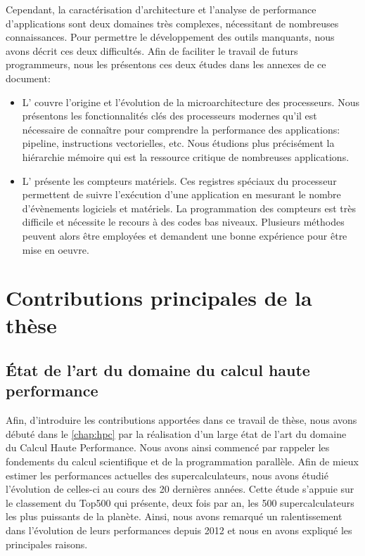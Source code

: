         Cependant, la caractérisation d'architecture et l'analyse de performance d'applications sont deux domaines très complexes, nécessitant de nombreuses connaissances. Pour permettre le développement des outils manquants, nous avons décrit ces deux difficultés. Afin de faciliter le travail de futurs programmeurs, nous les présentons ces deux études dans les annexes de ce document:
        \begin{itemize}
            \item L' couvre l'origine et l'évolution de la microarchitecture des processeurs. Nous présentons les fonctionnalités clés des processeurs modernes qu'il est nécessaire de connaître pour comprendre la performance des applications: pipeline, instructions vectorielles, etc. Nous étudions plus précisément la hiérarchie mémoire qui est la ressource critique de nombreuses applications. 
            
            \item L' présente les compteurs matériels. Ces registres spéciaux du processeur permettent de suivre l'exécution d'une application en mesurant le nombre d'évènements logiciels et matériels. La programmation des compteurs est très difficile et nécessite le recours à des codes bas niveaux. Plusieurs méthodes peuvent alors être employées et demandent une bonne expérience pour être mise en oeuvre.
        \end{itemize}


\section{Contributions principales de la thèse}
 

    \subsection{État de l'art du domaine du calcul haute performance}
        
        Afin, d'introduire les contributions apportées dans ce travail de thèse, nous avons débuté dans le \autoref{chap:hpc} par la réalisation d'un large état de l'art du domaine du Calcul Haute Performance. Nous avons ainsi commencé par rappeler les fondements du calcul scientifique et de la programmation parallèle. Afin de mieux estimer les performances actuelles des supercalculateurs, nous avons étudié l'évolution de celles-ci au cours des 20 dernières années. Cette étude s'appuie sur le classement du Top500 qui présente, deux fois par an, les 500 supercalculateurs les plus puissants de la planète. Ainsi, nous avons remarqué un ralentissement dans l'évolution de leurs performances depuis 2012 et nous en avons expliqué les principales raisons. 
        
